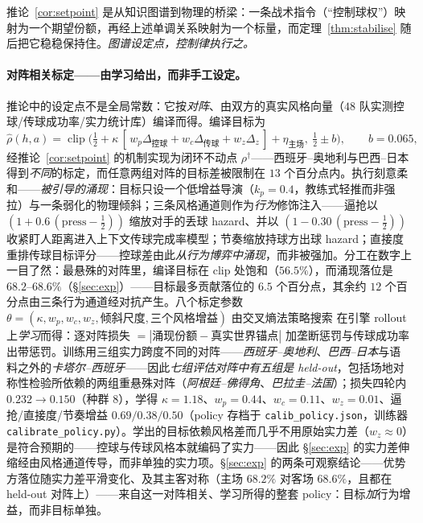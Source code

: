 \documentclass[11pt,UTF8,fontset=fandol]{ctexart}
\theoremstyle{plain}
\theoremstyle{definition}
\theoremstyle{remark}
\begin{document}
推论~\ref{cor:setpoint} 是从知识图谱到物理的桥梁：一条战术指令（“控制球权”）映射为一个期望份额，再经上述单调关系映射为一个标量，而定理~\ref{thm:stabilise} 随后把它稳稳保持住。\emph{图谱设定点，控制律执行之。}

\paragraph{对阵相关标定——由学习给出，而非手工设定。} 推论中的设定点不是全局常数：它按\emph{对阵}、由双方的真实风格向量（$48$ 队实测控球/传球成功率/实力统计库）编译而得。编译目标为
\[
\hat\rho(h,a)=\operatorname{clip}\!\big(\tfrac12+\kappa\,[\,w_p\Delta_{\text{控球}}+w_c\Delta_{\text{传球}}+w_z\Delta_z\,]+\eta_{\text{主场}},\ \tfrac12\pm b\big),\qquad b=0.065,
\]
经推论~\ref{cor:setpoint} 的机制实现为闭环不动点 $\rho^\dagger$——西班牙--奥地利与巴西--日本得到\emph{不同}的标定，而任意两组对阵的目标差被限制在 $13$ 个百分点内。执行刻意柔和——\emph{被引导的涌现}：目标只设一个低增益导演（$k_p=0.4$，教练式轻推而非强拉）与一条弱化的物理倾斜；三条风格通道则作为\emph{行为}修饰注入——逼抢以 $(1+0.6\,(\mathrm{press}-\tfrac12))$ 缩放对手的丢球 hazard、并以 $(1-0.30\,(\mathrm{press}-\tfrac12))$ 收紧盯人距离进入上下文传球完成率模型；节奏缩放持球方出球 hazard；直接度重排传球目标评分——控球差由此\emph{从行为博弈中涌现}，而非被强加。分工在数字上一目了然：最悬殊的对阵里，编译目标在 clip 处饱和（$56.5\%$），而涌现落位是 $68.2$--$68.6\%$（\S\ref{sec:exp}）——目标最多贡献落位的 $6.5$ 个百分点，其余约 $12$ 个百分点由三条行为通道经对抗产生。八个标定参数 $\theta=(\kappa,w_p,w_c,w_z,\text{倾斜尺度},\text{三个风格增益})$ 由交叉熵法策略搜索 \citep{rubinstein2004} 在引擎 rollout 上\emph{学习}而得：逐对阵损失 $=|\text{涌现份额}-\text{真实世界锚点}|$ 加垄断惩罚与传球成功率出带惩罚。训练用三组实力跨度不同的对阵——\emph{西班牙--奥地利}、\emph{巴西--日本}与语料之外的\emph{卡塔尔--西班牙}——因此\emph{七组评估对阵中有五组是 held-out}，包括场地对称性检验所依赖的两组重悬殊对阵（\emph{阿根廷--佛得角}、\emph{巴拉圭--法国}）；损失四轮内 $0.232\to0.150$（种群 $8$），学得 $\kappa=1.18$、$w_p=0.44$、$w_c=0.11$、$w_z=0.01$、逼抢/直接度/节奏增益 $0.69/0.38/0.50$（policy 存档于 \texttt{calib\_policy.json}，训练器 \texttt{calibrate\_policy.py}）。学出的目标依赖风格差而几乎不用原始实力差（$w_z\approx0$）是符合预期的——控球与传球风格本就编码了实力——因此 \S\ref{sec:exp} 的实力差伸缩经由风格通道传导，而非单独的实力项。\S\ref{sec:exp} 的两条可观察结论——优势方落位随实力差平滑变化、及其主客对称（主场 $68.2\%$ 对客场 $68.6\%$，且都在 held-out 对阵上）——来自这一对阵相关、学习所得的整套 policy：目标\emph{加}行为增益，而非目标单独。
\end{document}
